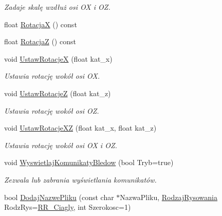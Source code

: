 \begin{DoxyCompactItemize}
\begin{DoxyCompactList}\small\item\em Zadaje skalę wzdłuż osi {\itshape OX} i {\itshape OZ}. \end{DoxyCompactList}\item 
float \mbox{\hyperlink{class_pz_g_1_1_lacze_do_g_n_u_plota_addf0b844f626f3f5220de70efcbbdbb3}{RotacjaX}} () const
\item 
float \mbox{\hyperlink{class_pz_g_1_1_lacze_do_g_n_u_plota_a9dac73754fab10644b287756003e9c79}{RotacjaZ}} () const
\item 
void \mbox{\hyperlink{class_pz_g_1_1_lacze_do_g_n_u_plota_a88324c53a70846fb6bc9d918ce21fd56}{Ustaw\+RotacjeX}} (float kat\+\_\+x)
\begin{DoxyCompactList}\small\item\em Ustawia rotację wokół osi {\itshape OX}. \end{DoxyCompactList}\item 
void \mbox{\hyperlink{class_pz_g_1_1_lacze_do_g_n_u_plota_a458399aa2a8f4b3f00ccd5b272857ea1}{Ustaw\+RotacjeZ}} (float kat\+\_\+z)
\begin{DoxyCompactList}\small\item\em Ustawia rotację wokół osi {\itshape OZ}. \end{DoxyCompactList}\item 
void \mbox{\hyperlink{class_pz_g_1_1_lacze_do_g_n_u_plota_a94d8527fd78048ed6cb32ffb29e5f903}{Ustaw\+Rotacje\+XZ}} (float kat\+\_\+x, float kat\+\_\+z)
\begin{DoxyCompactList}\small\item\em Ustawia rotację wokół osi {\itshape OX} i {\itshape OZ}. \end{DoxyCompactList}\item 
void \mbox{\hyperlink{class_pz_g_1_1_lacze_do_g_n_u_plota_a4531e6d166faf2e2c8bb4a54a9c9e1f8}{Wyswietlaj\+Komunikaty\+Bledow}} (bool Tryb=true)
\begin{DoxyCompactList}\small\item\em Zezwala lub zabrania wyświetlania komunikatów. \end{DoxyCompactList}\item 
bool \mbox{\hyperlink{class_pz_g_1_1_lacze_do_g_n_u_plota_a34bd48f57c0fd69c12bf4127a1cacd8f}{Dodaj\+Nazwe\+Pliku}} (const char $\ast$Nazwa\+Pliku, \mbox{\hyperlink{namespace_pz_g_a705c92106f39b7d0c34a6739d10ff0b6}{Rodzaj\+Rysowania}} Rodz\+Rys=\mbox{\hyperlink{namespace_pz_g_a705c92106f39b7d0c34a6739d10ff0b6a927eaa159aa4bd3198f0a330b967746d}{R\+R\+\_\+\+Ciagly}}, int Szerokosc=1)

\end{DoxyCompactItemize}
